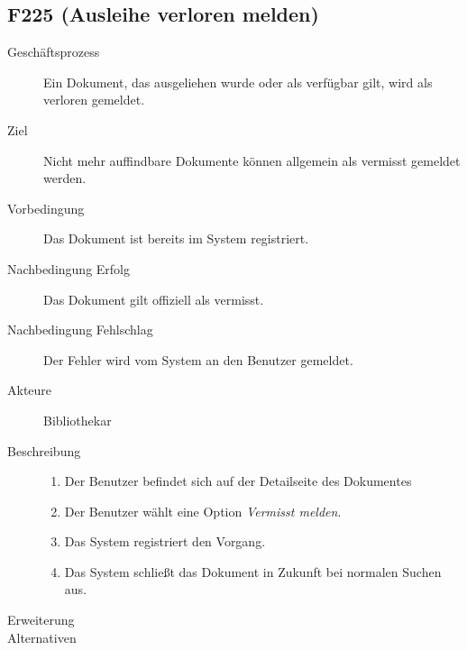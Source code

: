 \subsection{F225 (Ausleihe verloren melden)}
\label{F:AusleiheVerlohren}
\begin{description}
  \item[Geschäftsprozess]Ein Dokument, das ausgeliehen wurde oder als verfügbar gilt, wird als verloren gemeldet.
  \item[Ziel]Nicht mehr auffindbare Dokumente können allgemein als vermisst gemeldet werden.
  \item[Vorbedingung]Das Dokument ist bereits im System registriert.
  \item[Nachbedingung Erfolg]Das Dokument gilt offiziell als vermisst.
  \item[Nachbedingung Fehlschlag]Der Fehler wird vom System an den Benutzer gemeldet.
  \item[Akteure]Bibliothekar
  \item[Beschreibung]\hfill
    \begin{enumerate}
      \item Der Benutzer befindet sich auf der Detailseite des Dokumentes
      \item Der Benutzer wählt eine Option \emph{Vermisst melden}.
      \item Das System registriert den Vorgang.
      \item Das System schließt das Dokument in Zukunft bei normalen Suchen aus.
    \end{enumerate}
  \item[Erweiterung]\hfill
  \item[Alternativen]
\end{description}


